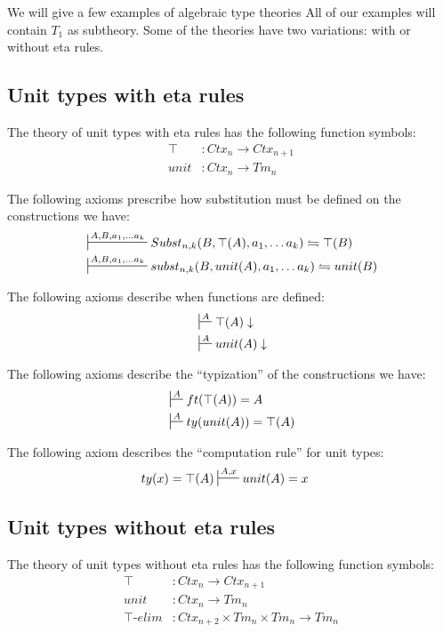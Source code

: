 \documentclass{amsart}
\theoremstyle{definition}
\theoremstyle{remark}
\numberwithin{figure}{section}
\begin{document}
We will give a few examples of algebraic type theories
All of our examples will contain $T_1$ as subtheory.
Some of the theories have two variations: with or without eta rules.

\subsection{Unit types with eta rules}
The theory of unit types with eta rules has the following function symbols:
\begin{align*}
\top & : Ctx_n \to Ctx_{n+1} \\
unit & : Ctx_n \to Tm_n
\end{align*}

The following axioms prescribe how substitution must be defined on the constructions we have:
\begin{align*}
& \sststile{}{A, B, a_1, \ldots a_k} Subst_{n,k}(B, \top(A), a_1, \ldots a_k) \leftrightharpoons \top(B) \\
& \sststile{}{A, B, a_1, \ldots a_k} subst_{n,k}(B, unit(A), a_1, \ldots a_k) \leftrightharpoons unit(B)
\end{align*}

The following axioms describe when functions are defined:
\begin{align*}
& \sststile{}{A} \top(A) \downarrow \\
& \sststile{}{A} unit(A) \downarrow
\end{align*}

The following axioms describe the ``typization'' of the constructions we have:
\begin{align*}
& \sststile{}{A} ft(\top(A)) = A \\
& \sststile{}{A} ty(unit(A)) = \top(A)
\end{align*}

The following axiom describes the ``computation rule'' for unit types:
\begin{align*}
ty(x) = \top(A) & \sststile{}{A,x} unit(A) = x
\end{align*}

\subsection{Unit types without eta rules}
The theory of unit types without eta rules has the following function symbols:
\begin{align*}
\top             & : Ctx_n \to Ctx_{n+1} \\
unit             & : Ctx_n \to Tm_n \\
\top\text{-}elim & : Ctx_{n+2} \times Tm_n \times Tm_n \to Tm_n
\end{align*}
\end{document}
